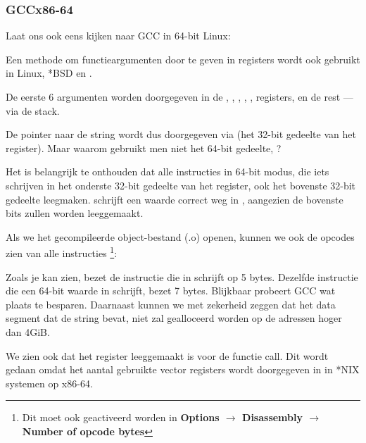 \subsubsection{GCC\EMDASH{}x86-64}

Laat ons ook eens kijken naar GCC in 64-bit Linux:



Een methode om functieargumenten door te geven in registers wordt ook gebruikt in Linux, *BSD en \MacOSX \SysVABI.

De eerste 6 argumenten worden doorgegeven in de \RDI, \RSI, \RDX, \RCX, ,  registers, en de rest --- via de stack.

De pointer naar de string wordt dus doorgegeven via \EDI (het 32-bit gedeelte van het register).
Maar waarom gebruikt men niet het 64-bit gedeelte, \RDI?

Het is belangrijk te onthouden dat alle \MOV instructies in 64-bit modus, die iets schrijven in het onderste 32-bit gedeelte van het register, ook het bovenste 32-bit gedeelte leegmaken.
 schrijft een waarde correct weg in \RAX, aangezien de bovenste bits zullen worden leeggemaakt.

Als we het gecompileerde object-bestand (.o) openen, kunnen we ook de opcodes zien van alle instructies
\footnote{Dit moet ook geactiveerd worden in \textbf{Options $\rightarrow$ Disassembly $\rightarrow$ Number of opcode bytes}}:



\label{hw_EDI_instead_of_RDI}
Zoals je kan zien, bezet de instructie die in \EDI schrijft op  5 bytes.
Dezelfde instructie die een 64-bit waarde in \RDI schrijft, bezet 7 bytes.
Blijkbaar probeert GCC wat plaats te besparen.
Daarnaast kunnen we met zekerheid zeggen dat het data segment dat de string bevat, niet zal gealloceerd worden op de adressen hoger dan 4\gls{GiB}.

\label{SysVABI_input_EAX}
We zien ook dat het \EAX register leeggemaakt is voor de \printf functie call.
Dit wordt gedaan omdat het aantal gebruikte vector registers wordt doorgegeven in \EAX in *NIX systemen op x86-64.

